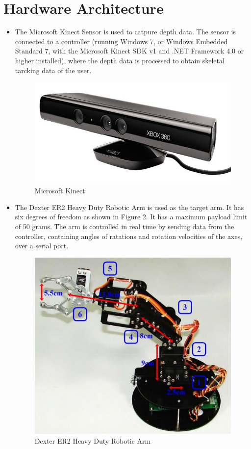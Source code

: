 \documentclass[a4paper,11pt]{article}
\begin{document}
\section{Hardware Architecture}
\begin{itemize}
\item The Microsoft Kinect Sensor is used to catpure depth data. The sensor is connected to a controller (running Windows 7, or Windows Embedded Standard 7, with the Microsoft Kinect SDK v1 and .NET Framework 4.0 or higher installed), where the depth data is processed to obtain skeletal tarcking data of the user. 

\begin{figure}[htp]
\centering
\includegraphics[scale=0.4]{images/kinect.jpg}
\caption{Microsoft Kinect} 
\end{figure}

\item The Dexter ER2 Heavy Duty Robotic Arm is used as the target arm. It has six degrees of freedom as shown in Figure 2. It has a maximum payload limit of 50 grams. The arm is controlled in real time by sending data from the controller, containing angles of ratations and rotation velocities of the axes, over a serial port.
\begin{figure}[htp]
\centering
\includegraphics[scale=0.42]{images/arm-axes.jpg}
\caption{Dexter ER2 Heavy Duty Robotic Arm} 
\end{figure}


\end{itemize}
\end{document}
